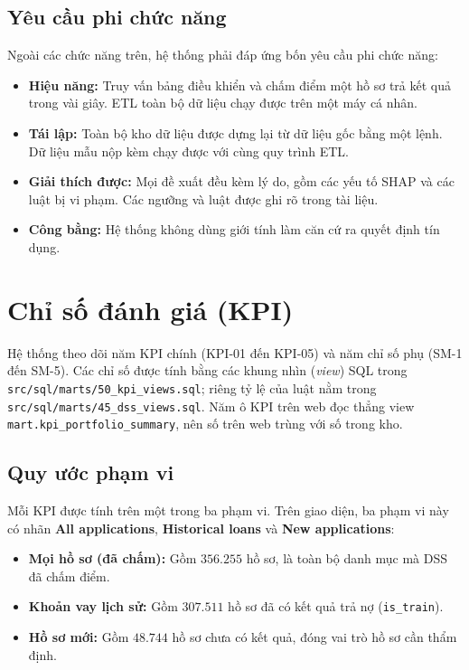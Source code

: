 \subsection{Yêu cầu phi chức năng}
\label{sec:nfr}
Ngoài các chức năng trên, hệ thống phải đáp ứng bốn yêu cầu phi chức năng:
\begin{itemize}[topsep=0pt, itemsep=1pt]
	\item \textbf{Hiệu năng:} Truy vấn bảng điều khiển và chấm điểm một hồ sơ trả kết quả trong vài giây. ETL toàn bộ dữ liệu chạy được trên một máy cá nhân.
	\item \textbf{Tái lập:} Toàn bộ kho dữ liệu được dựng lại từ dữ liệu gốc bằng một lệnh. Dữ liệu mẫu nộp kèm chạy được với cùng quy trình ETL.
	\item \textbf{Giải thích được:} Mọi đề xuất đều kèm lý do, gồm các yếu tố SHAP và các luật bị vi phạm. Các ngưỡng và luật được ghi rõ trong tài liệu.
	\item \textbf{Công bằng:} Hệ thống không dùng giới tính làm căn cứ ra quyết định tín dụng.
\end{itemize}

\section{Chỉ số đánh giá (KPI)}
\label{sec:kpi}
Hệ thống theo dõi năm KPI chính (KPI-01 đến KPI-05) và năm chỉ số phụ (SM-1 đến SM-5). Các chỉ số được tính bằng các khung nhìn (\textit{view}) SQL trong \texttt{src/sql/marts/50\_kpi\_views.sql}; riêng tỷ lệ của luật nằm trong \texttt{src/sql/marts/45\_dss\_views.sql}. Năm ô KPI trên web đọc thẳng view \texttt{mart.kpi\_portfolio\_summary}, nên số trên web trùng với số trong kho.

\subsection{Quy ước phạm vi}
\label{sec:kpi-scope}
Mỗi KPI được tính trên một trong ba phạm vi. Trên giao diện, ba phạm vi này có nhãn \textbf{All applications}, \textbf{Historical loans} và \textbf{New applications}:
\begin{itemize}[topsep=0pt, itemsep=1pt]
	\item \textbf{Mọi hồ sơ (đã chấm):} Gồm $356.255$ hồ sơ, là toàn bộ danh mục mà DSS đã chấm điểm.
	\item \textbf{Khoản vay lịch sử:} Gồm $307.511$ hồ sơ đã có kết quả trả nợ (\texttt{is\_train}).
	\item \textbf{Hồ sơ mới:} Gồm $48.744$ hồ sơ chưa có kết quả, đóng vai trò hồ sơ cần thẩm định.
\end{itemize}

